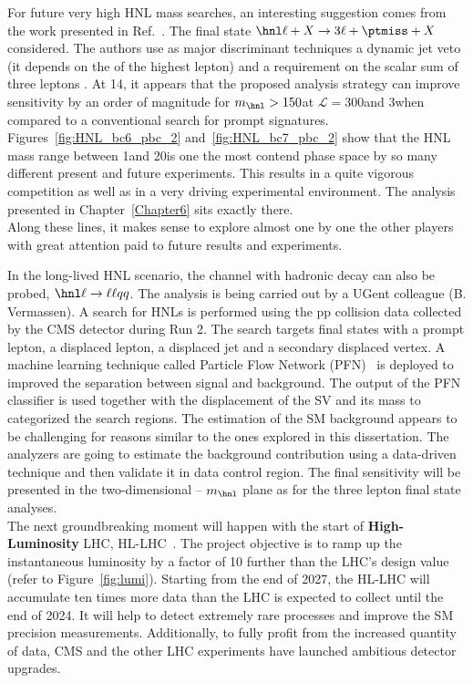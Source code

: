 For future very high HNL mass searches, an interesting suggestion comes from
the work presented in Ref.~\cite{Pascoli_2019}. The
final state $\hnl \ell + X\rightarrow 3\ell + \ptmiss + X$
considered. The
authors use as major
discriminant techniques a dynamic
jet veto (\ie it depends on the \pt of the highest \pt lepton) and a
requirement on the scalar sum of three leptons \pt. At 14\TeV, it appears that
the proposed analysis strategy can
improve sensitivity by an order of
magnitude for $m_\hnl > 150$\GeV at $\mathcal{L} = 300$\fbinv and
3\abinv when compared to a conventional search for prompt signatures. \\

Figures~\ref{fig:HNL_bc6_pbc_2} and~\ref{fig:HNL_bc7_pbc_2} show that
the HNL mass range between 1\GeV and 20\GeV is one the most contend phase
space by so many different present and future experiments. This
results in a quite vigorous competition as well as in a very driving
experimental environment. The analysis presented in Chapter~\ref{Chapter6} sits exactly there. \\
Along these lines, it makes sense to explore almost one by one the
other players with great attention paid to future results and experiments.

In the long-lived HNL scenario, the channel with hadronic \PW decay
can also be probed, \ie $\hnl \ell \rightarrow \ell \ell q q $. The analysis is being carried out by a UGent
colleague (B. Vermassen). A search for HNLs is performed using the pp collision
data collected by the CMS detector during Run
2. The search targets final states with a prompt lepton, a displaced lepton, a
displaced jet and a secondary displaced vertex. A machine learning technique called Particle Flow Network (PFN)~\cite{Komiske_2019} is deployed to
improved the separation between signal and background.
The output of the PFN classifier is used together with the
displacement of the SV and its mass to categorized the search regions.
The estimation of the SM background appears to be challenging for
reasons similar to the ones explored in this dissertation. The
analyzers are going to estimate the background contribution using a data-driven 
technique and then validate it in data control region. The
final sensitivity will be presented in the two-dimensional \mixpar -- $m_\hnl$
plane as for the three lepton final state analyses.\\

The next groundbreaking moment will happen with the start of
\textbf{High-Luminosity} LHC,
HL-LHC~\cite{ZurbanoFernandez:2020cco}. The project objective is to ramp up the instantaneous luminosity by a factor of 10 further than the LHC’s design value
(refer to Figure~\ref{fig:lumi}).
Starting from the end of 2027, the HL-LHC will accumulate ten times
more data than the LHC is expected to collect until the end of 2024. It will help to
detect extremely rare processes and improve the SM precision
measurements. Additionally, to fully profit from the increased quantity of data, CMS and the other
LHC experiments have launched ambitious detector upgrades.

